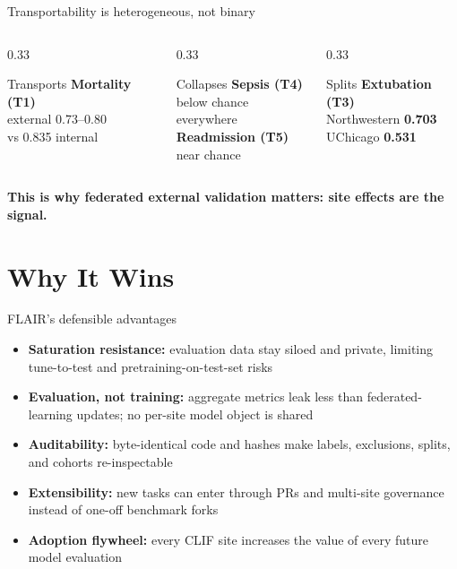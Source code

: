 \documentclass[aspectratio=169,11pt,xcolor={table}]{beamer}
\newcommand{\emphc}[1]{{\color{flairblue}\textbf{#1}}}
\newcommand{\rushc}[1]{{\color{flairred}\textbf{#1}}}
\newcommand{\bigclaim}[1]{\begin{center}{\Large\color{flairink}\textbf{#1}}\end{center}}
\begin{document}
\begin{frame}{Transportability is heterogeneous, not binary}
  \begin{columns}[T]
  \begin{column}{0.33\textwidth}
    \begin{block}{Transports}
      \textbf{Mortality (T1)}\\ external 0.73--0.80\\ vs 0.835 internal
    \end{block}
  \end{column}
  \begin{column}{0.33\textwidth}
    \begin{block}{Collapses}
      \textbf{Sepsis (T4)}\\ below chance everywhere\\ \textbf{Readmission (T5)}\\ near chance
    \end{block}
  \end{column}
  \begin{column}{0.33\textwidth}
    \begin{block}{Splits}
      \textbf{Extubation (T3)}\\ Northwestern \emphc{0.703}\\ UChicago \rushc{0.531}
    \end{block}
  \end{column}
  \end{columns}
  \vfill
  \bigclaim{This is why federated external validation matters: site effects are the signal.}
\end{frame}

\section{Why It Wins}

\begin{frame}{FLAIR's defensible advantages}
  \begin{itemize}
    \item \emphc{Saturation resistance:} evaluation data stay siloed and private, limiting tune-to-test and pretraining-on-test-set risks
    \item \emphc{Evaluation, not training:} aggregate metrics leak less than federated-learning updates; no per-site model object is shared
    \item \emphc{Auditability:} byte-identical code and hashes make labels, exclusions, splits, and cohorts re-inspectable
    \item \emphc{Extensibility:} new tasks can enter through PRs and multi-site governance instead of one-off benchmark forks
    \item \emphc{Adoption flywheel:} every CLIF site increases the value of every future model evaluation
  \end{itemize}
\end{frame}
\end{document}
